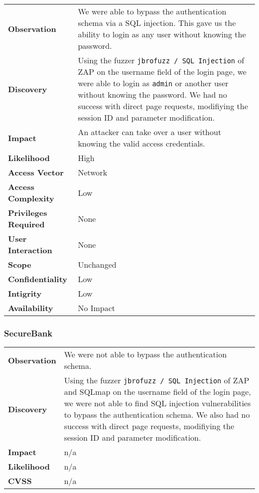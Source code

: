 \begin{tabular}{l|p{10cm}}

\textbf{Observation} & We were able to bypass the authentication schema via a SQL injection. This gave us the ability to login as any user without knowing the password. \\
\textbf{Discovery} & Using the fuzzer \texttt{jbrofuzz / SQL Injection} of ZAP on the username field of the login page, we were able to login as \texttt{admin} or another user without knowing the password. We had no success with direct page requests, modifiying the session ID and parameter modification. \\
\textbf{Impact} & An attacker can take over a user without knowing the valid access credentials. \\
\textbf{Likelihood} & High \\
\textbf{Access Vector} & Network \\
\textbf{Access Complexity} & Low \\
\textbf{Privileges Required} & None \\
\textbf{User Interaction} & None \\
\textbf{Scope} & Unchanged \\
\textbf{Confidentiality} & Low \\
\textbf{Intigrity} & Low \\
\textbf{Availability} & No Impact \\
\end{tabular}

\subsubsection*{SecureBank}

\begin{tabular}{l|p{10cm}}

\textbf{Observation} & We were not able to bypass the authentication schema. \\
\textbf{Discovery} & Using the fuzzer \texttt{jbrofuzz / SQL Injection} of ZAP and SQLmap on the username field of the login page, we were not able to find SQL injection vulnerabilities to bypass the authentication schema. We also had no success with direct page requests, modifiying the session ID and parameter modification.   \\
\textbf{Impact} & n/a \\
\textbf{Likelihood} & n/a \\
\textbf{CVSS} & n/a \\
\end{tabular}

